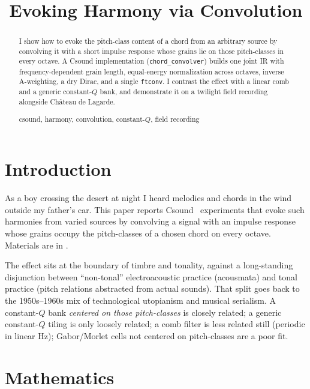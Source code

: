 \documentclass[runningheads,a4paper]{llncs}
\newcommand{\keywords}[1]{\par\addvspace\baselineskip
\noindent\keywordname\enspace\ignorespaces#1}
\begin{document}
\mainmatter

\title{Evoking Harmony via Convolution}
\author{\submissionauthor}
\authorrunning{\submissionauthorrunning}
\institute{\submissioninstitute}

\maketitle

\begin{abstract}
I show how to evoke the pitch-class content of a chord from an arbitrary
source by convolving it with a short impulse response whose grains lie on
those pitch-classes in every octave. A Csound implementation
(\texttt{chord\_convolver}) builds one joint IR with
frequency-dependent grain length, equal-energy normalization across octaves,
inverse A-weighting, a dry Dirac, and a single \texttt{ftconv}. I contrast the effect with a linear comb and a generic
constant-$Q$ bank, and demonstrate it on a twilight field recording alongside Ch\^{a}teau de
Lagarde.
\keywords{csound, harmony, convolution, constant-$Q$, field recording}
\end{abstract}

\section{Introduction}

As a boy crossing the desert at night I heard melodies and chords in the wind
outside my father's car. This paper reports Csound~\cite{csound_home} experiments that
evoke such harmonies from varied sources by convolving a signal with an
impulse response whose grains occupy the pitch-classes of a chosen chord on every
octave. Materials are in \submissionmaterialsrepo.

The effect sits at the boundary of timbre and tonality, against a long-standing
disjunction between ``non-tonal'' electroacoustic practice (acousmata) and
tonal practice (pitch relations abstracted from actual sounds). That split
goes back to the 1950s--1960s mix of technological utopianism and musical
serialism. A constant-$Q$ bank \emph{centered on those pitch-classes} is
closely related; a generic constant-$Q$ tiling is only loosely related; a comb
filter is less related still (periodic in linear Hz); Gabor/Morlet cells not
centered on pitch-classes are a poor fit.

\section{Mathematics}
\end{document}
